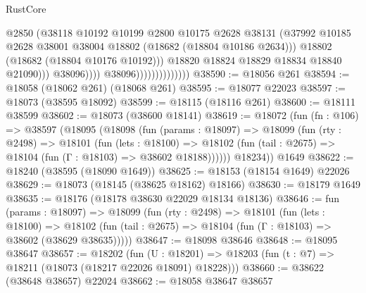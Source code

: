 \begin{lexlean}{RustCore}
\begin{coremodule}
                                              @2850
                                              (@38118
                                                @10192
                                                @10199
                                                @2800
                                                @10175
                                                @2628
                                                @38131
                                                (@37992
                                                  @10185
                                                  @2628
                                                  @38001
                                                  @38004
                                                  @18802
                                                  (@18682 (@18804 @10186 @2634)))
                                                @18802
                                                (@18682 (@18804 @10176 @10192)))
                                              @18820
                                              @18824
                                              @18829
                                              @18834
                                              @18840
                                              @21090)))
                                        @38096))))
                                @38096))))))))))))))
@38590 := @18056 @261
@38594 := @18058 (@18062 @261) (@18068 @261)
@38595 := @18077 @22023
@38597 := @18073 (@38595 @18092)
@38599 := @18115 (@18116 @261)
@38600 := @18111 @38599
@38602 := @18073 (@38600 @18141)
@38619 := @18072
    (fun (fn : @106) =>
    @38597
      (@18095
        (@18098
          (fun (params : @18097) =>
          @18099
            (fun (rty : @2498) =>
            @18101
              (fun (lets : @18100) =>
              @18102 (fun (tail : @2675) => @18104 (fun (Γ : @18103) => @38602 @18188))))))
        @18234))
    @1649
@38622 := @18240 (@38595 (@18090 @1649))
@38625 := @18153 (@18154 @1649) @22026
@38629 := @18073 (@18145 (@38625 @18162) @18166)
@38630 := @18179 @1649
@38635 := @18176 (@18178 @38630 @22029 @18134 @18136)
@38646 := fun (params : @18097) =>
  @18099
    (fun (rty : @2498) =>
    @18101
      (fun (lets : @18100) =>
      @18102 (fun (tail : @2675) => @18104 (fun (Γ : @18103) => @38602 (@38629 @38635)))))
@38647 := @18098 @38646
@38648 := @18095 @38647
@38657 := @18202
    (fun (U : @18201) => @18203 (fun (t : @7) => @18211 (@18073 (@18217 @22026 @18091) @18228)))
@38660 := @38622 (@38648 @38657) @22024
@38662 := @18058 @38647 @38657

\end{coremodule}
\end{lexlean}
